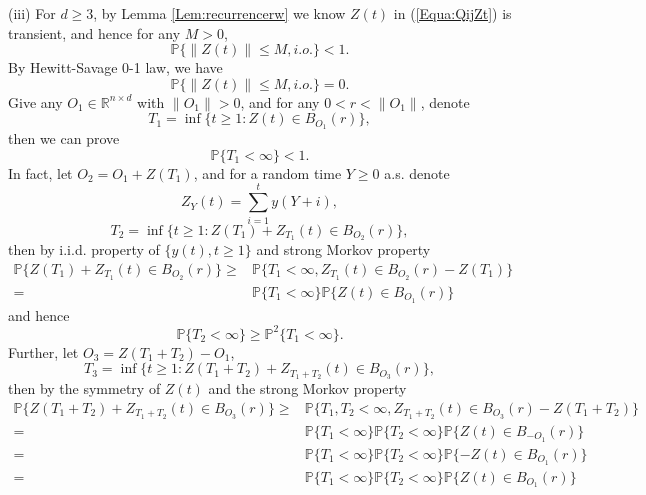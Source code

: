 \documentclass[11pt]{article}
\theoremstyle{definition}
\theoremstyle{remark}
\numberwithin{equation}{section}
\begin{document}
(iii) For $d\geq 3$, by Lemma \ref{Lem:recurrencerw} we know $Z(t)$ in (\ref{Equa:QijZt}) is transient, and hence for any $M>0$,
\begin{equation*}
  \mathbb{P}\{\| Z(t)\|\leq M, i.o.\}<1.
\end{equation*}
By Hewitt-Savage 0-1 law, we have
\begin{equation}\label{Equa:Ztboundprob0}
  \mathbb{P}\{\| Z(t)\|\leq M, i.o.\}=0.
\end{equation}
Give any $O_1\in \mathbb{R}^{n\times d}$ with $\| O_1\|>0$, and for any $0<r<\| O_1\|$, denote
\begin{equation}\label{Equa:defT1unbound}
  T_1=\inf\{t\geq 1: Z(t)\in B_{O_1}(r)\},
\end{equation}
then we can prove
\begin{equation*}
 \mathbb{P}\{T_1<\infty\}<1.
\end{equation*}
In fact, let $O_2=O_1+Z(T_1)$, and for a random time $Y\geq 0$ a.s. denote
\begin{equation*}
  Z_Y(t)=\sum_{i=1}^ty(Y+i),
\end{equation*}
\begin{equation}
  T_2=\inf\{t\geq 1: Z(T_1)+Z_{T_1}(t)\in B_{O_2}(r)\},
\end{equation}
then by i.i.d. property of $\{y(t), t\geq 1\}$ and strong Morkov property
\begin{equation}
\begin{split}
   \mathbb{P}\{Z(T_1)+Z_{T_1}(t)\in B_{O_2}(r)\}\geq& \mathbb{P}\{T_1<\infty,Z_{T_1}(t)\in B_{O_2}(r)-Z(T_1)\}\\
   =&\mathbb{P}\{T_1<\infty\}\mathbb{P}\{Z(t)\in B_{O_1}(r)\}
\end{split}
\end{equation}
and hence
\begin{equation}\label{Equa:T2iterT1}
 \mathbb{P}\{T_2<\infty\}\geq\mathbb{P}^2\{T_1<\infty\}.
\end{equation}
Further, let $O_3=Z(T_1+T_2)-O_1$,
\begin{equation}
  T_3=\inf\{t\geq 1: Z(T_1 +T_2)+Z_{T_1+T_2}(t)\in B_{O_3}(r)\},
\end{equation}
then by the symmetry of $Z(t)$ and the strong Morkov property
\begin{equation}
\begin{split}
   \mathbb{P}\{Z(T_1+ T_2)+Z_{T_1+T_2}(t)\in B_{O_3}(r)\}\geq& \mathbb{P}\{T_1,T_2<\infty,Z_{T_1+T_2}(t)\in B_{O_3}(r)-Z(T_1+ T_2)\}\\
   =&\mathbb{P}\{T_1<\infty\}\mathbb{P}\{T_2<\infty\}\mathbb{P}\{Z(t)\in B_{-O_1}(r)\}\\
   =&\mathbb{P}\{T_1<\infty\}\mathbb{P}\{T_2<\infty\}\mathbb{P}\{-Z(t)\in B_{O_1}(r)\}\\
   =&\mathbb{P}\{T_1<\infty\}\mathbb{P}\{T_2<\infty\}\mathbb{P}\{Z(t)\in B_{O_1}(r)\}
\end{split}
\end{equation}
\end{document}
